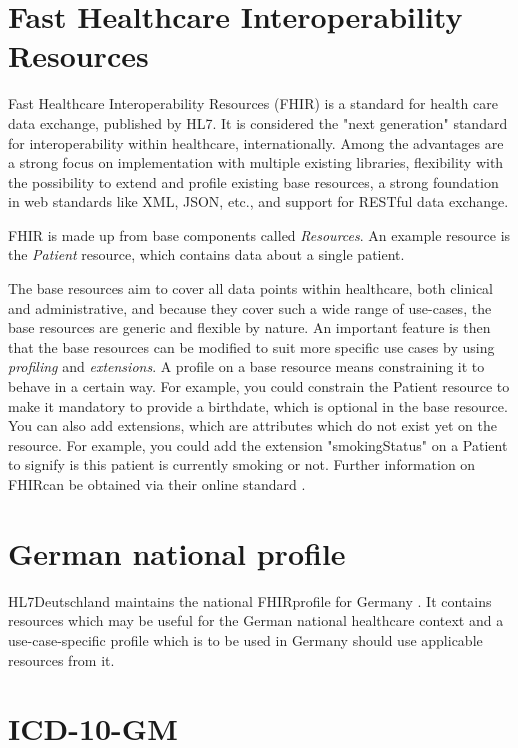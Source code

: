 \documentclass[12px]{report}
\newcommand{\fhir}{FHIR\textsuperscript{\textregistered}}
\newcommand{\hl}{HL7\textsuperscript{\textregistered}}
\begin{document}
\section{Fast Healthcare Interoperability Resources}
Fast Healthcare Interoperability Resources (\fhir) \cite{FHIR} is a standard for health care data exchange, published by \hl. It is considered the "next generation" standard for interoperability within healthcare, internationally.
Among the advantages are a strong focus on implementation with multiple existing libraries, flexibility with the possibility to extend and profile existing base resources, a strong foundation in web standards like XML, JSON, etc., and support for RESTful data exchange.

FHIR is made up from base components called \textit{Resources}. An example resource is the \textit{Patient} resource, which contains data about a single patient. 

The base resources aim to cover all data points within healthcare, both clinical and administrative, and because they cover such a wide range of use-cases, the base resources are generic and flexible by nature.
An important feature is then that the base resources can be modified to suit more specific use cases by using \textit{profiling} and \textit{extensions}. A profile on a base resource means constraining it to behave in a certain way.
For example, you could constrain the Patient resource to make it mandatory to provide a birthdate, which is optional in the base resource. You can also add extensions, which are attributes which do not exist yet on the resource. For example, you could
add the extension "smokingStatus" on a Patient to signify is this patient is currently smoking or not. Further information on \fhir can be obtained via their online standard \cite{FHIR}.

\section{German national profile}
\hl Deutschland \cite{hlde} maintains the national \fhir profile for Germany \cite{debasis}. It contains resources which may be useful for the German national healthcare context and a use-case-specific profile which is to be used in Germany should use applicable resources from it.

\section{ICD-10-GM}
\end{document}
